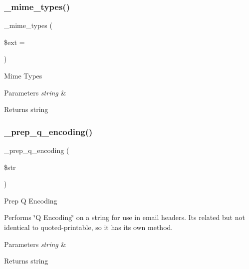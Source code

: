 \subsubsection{\texorpdfstring{\+\_\+mime\+\_\+types()}{\_mime\_types()}}
{\footnotesize\ttfamily \+\_\+mime\+\_\+types (\begin{DoxyParamCaption}\item[{}]{\$ext = {\ttfamily \textquotesingle{}\textquotesingle{}} }\end{DoxyParamCaption})\hspace{0.3cm}{\ttfamily [protected]}}

Mime Types


\begin{DoxyParams}{Parameters}
{\em string} & \\
\hline
\end{DoxyParams}
\begin{DoxyReturn}{Returns}
string 
\end{DoxyReturn}
\mbox{\label{class_c_i___email_a56a4d842c3dfe77bcb41082a82c5df24}} 
\subsubsection{\texorpdfstring{\+\_\+prep\+\_\+q\+\_\+encoding()}{\_prep\_q\_encoding()}}
{\footnotesize\ttfamily \+\_\+prep\+\_\+q\+\_\+encoding (\begin{DoxyParamCaption}\item[{}]{\$str }\end{DoxyParamCaption})\hspace{0.3cm}{\ttfamily [protected]}}

Prep Q Encoding

Performs \char`\"{}\+Q Encoding\char`\"{} on a string for use in email headers. It\textquotesingle{}s related but not identical to quoted-\/printable, so it has its own method.


\begin{DoxyParams}{Parameters}
{\em string} & \\
\hline
\end{DoxyParams}
\begin{DoxyReturn}{Returns}
string 
\end{DoxyReturn}
\mbox{\label{class_c_i___email_af2beda05a0ab5d0ec65b03da633b1d33}} 
